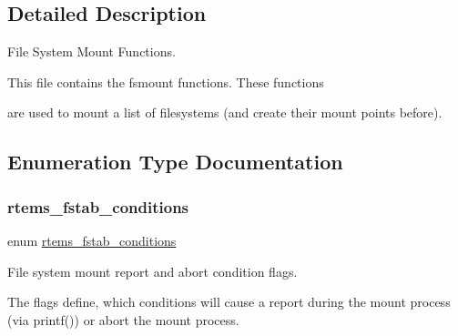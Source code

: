 \subsection{Detailed Description}
File System Mount Functions. 

This file contains the fsmount functions. These functions

are used to mount a list of filesystems (and create their mount points before). 

\subsection{Enumeration Type Documentation}
\mbox{\label{group__rtems__fstab_gabcbeff39e673bbef9ec0960f64d19228}} 
\subsubsection{\texorpdfstring{rtems\_fstab\_conditions}{rtems\_fstab\_conditions}}
{\footnotesize\ttfamily enum \mbox{\hyperlink{group__rtems__fstab_gabcbeff39e673bbef9ec0960f64d19228}{rtems\+\_\+fstab\+\_\+conditions}}}

File system mount report and abort condition flags.

The flags define, which conditions will cause a report during the mount process (via printf()) or abort the mount process.

